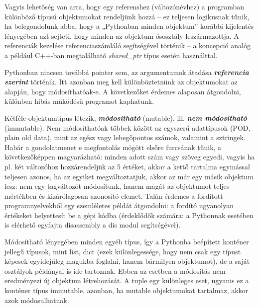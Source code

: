 \documentclass[12pt,a4paper,oneside]{report}             %
\begin{document}
Vagyis lehetőség van arra, hogy egy referenshez (változónévhez) a programban különböző típusú objektumokat rendeljünk hozzá – ez teljesen logikusnak tűnik, ha belegondolunk abba, hogy a „Pythonban minden objektum” korábbi kijelentés lényegében azt sejteti, hogy minden az objektum ősosztály leszármazottja. A referenciák kezelése referenciaszámláló segítségével történik – a koncepció analóg a például C++-ban megtalálható \emph{shared\_ptr} típus esetén használttal.

Pythonban nincsen továbbá pointer sem, az argumentumok átadása \textbf{\textit{referencia szerint}} történik. Itt azonban meg kell különböztetnünk az objektumokat az alapján, hogy módosíthatóak-e. A következőket érdemes alaposan átgondolni, különben hibás működésű programot kaphatunk.

Kétféle objektumtípus létezik, \textbf{\textit{módosítható}} (mutable), ill. \textbf{\textit{nem módosítható}} (immutable). Nem módosíthatóak többek között az egyszerű adattípusok (POD, plain old data), mint az egész vagy lebegőpontos számok, valamint a sztringek. Habár a gondolatmenet e megfontolás mögött elsőre furcsának tűnik, a következőképpen magyarázható: minden adott szám vagy szöveg egyedi, vagyis ha pl. két változóhoz hozzárendeljük az 5 értéket, akkor a kettő tartalma egymással teljesen azonos, ha az egyiket megváltoztatjuk, akkor az már egy másik objektum lesz: nem egy tagváltozót módosítunk, hanem magát az objektumot teljes mértékben és kizárólagosan azonosító elemet. Talán érdemes a fordított programnyelvekből egy szemléletes példát átgondolni: a fordító ugyanolyan értékeket helyettesít be a gépi kódba (érdeklődők számára: a Pythonnak esetében is elérhető egyfajta disassembly a dis modul segítségével).

Módosítható lényegében minden egyéb típus, így a Pythonba beépített konténer jellegű típusok, mint list, dict (ezek különlegessége, hogy nem csak egy típust képesek egyidejűleg magukba foglalni, hanem bármilyen objektumot), de a saját osztályok példányai is ide tartoznak. Ebben az esetben a módosítás nem eredményezi új objektum létrehozását. A tuple egy különleges eset, ugyanis ez a konténer típus immutable, azonban, ha mutable objektumokat tartalmaz, akkor azok módosulhatnak.
\end{document}
